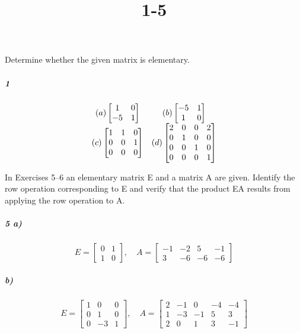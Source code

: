 \documentclass[fleqn]{article}
\title{1-5}
\begin{document}
\maketitle
\pagebreak
 Determine whether the given matrix is elementary.

\subparagraph{1}

\[
    \begin{array}{c c}(a) \begin{bmatrix} 1 & 0 \\ -5 & 1 \end{bmatrix} & (b) \begin{bmatrix} -5 & 1 \\ 1 & 0 \end{bmatrix} 
    \\ (c) \begin{bmatrix} 1 & 1 & 0 \\ 0 & 0 & 1 \\ 0 & 0 & 0 \end{bmatrix} & (d) \begin{bmatrix} 2 & 0 & 0 & 2 \\ 0 & 1 & 0 & 0 \\ 0 & 0 & 1 & 0 \\ 0 & 0 & 0 & 1 \end{bmatrix} \end{array}
\]
\vfill

 In Exercises 5–6 an elementary matrix E and a matrix A are given. Identify the row operation corresponding to E and verify that the product EA results from applying the row operation to A.

\subparagraph{5 a)}

\[
E = \begin{bmatrix} 0 & 1 \\ 1 & 0 \end{bmatrix}, \quad A = \begin{bmatrix} -1 & -2 & 5 & -1 \\ 3 & -6 & -6 & -6 \end{bmatrix}
\]
\vfill


\pagebreak


\subparagraph{b)}

\[
E = \begin{bmatrix} 1 & 0 & 0 \\ 0 & 1 & 0 \\ 0 & -3 & 1 \end{bmatrix}, \quad A = \begin{bmatrix} 2 & -1 & 0 & -4 & -4 \\ 1 & -3 & -1 & 5 & 3 \\ 2 & 0 & 1 & 3 & -1 \end{bmatrix}
\]
\vfill
\end{document}
